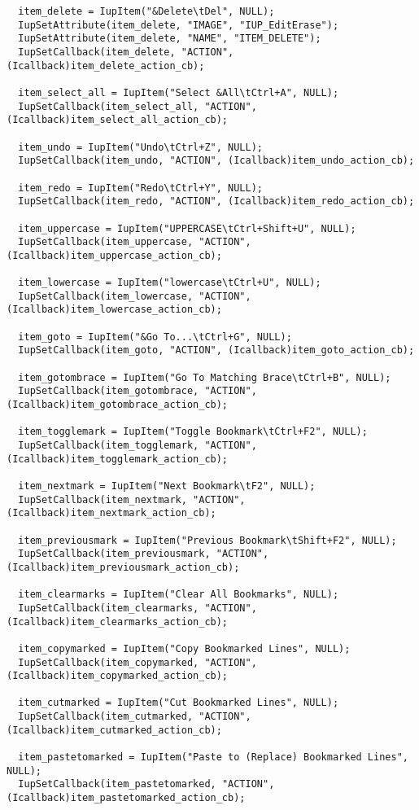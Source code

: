 \documentclass{ctexart}
\begin{document}
\begin{lstlisting}
  item_delete = IupItem("&Delete\tDel", NULL);
  IupSetAttribute(item_delete, "IMAGE", "IUP_EditErase");
  IupSetAttribute(item_delete, "NAME", "ITEM_DELETE");
  IupSetCallback(item_delete, "ACTION", (Icallback)item_delete_action_cb);

  item_select_all = IupItem("Select &All\tCtrl+A", NULL);
  IupSetCallback(item_select_all, "ACTION", (Icallback)item_select_all_action_cb);

  item_undo = IupItem("Undo\tCtrl+Z", NULL);
  IupSetCallback(item_undo, "ACTION", (Icallback)item_undo_action_cb);

  item_redo = IupItem("Redo\tCtrl+Y", NULL);
  IupSetCallback(item_redo, "ACTION", (Icallback)item_redo_action_cb);

  item_uppercase = IupItem("UPPERCASE\tCtrl+Shift+U", NULL);
  IupSetCallback(item_uppercase, "ACTION", (Icallback)item_uppercase_action_cb);

  item_lowercase = IupItem("lowercase\tCtrl+U", NULL);
  IupSetCallback(item_lowercase, "ACTION", (Icallback)item_lowercase_action_cb);

  item_goto = IupItem("&Go To...\tCtrl+G", NULL);
  IupSetCallback(item_goto, "ACTION", (Icallback)item_goto_action_cb);

  item_gotombrace = IupItem("Go To Matching Brace\tCtrl+B", NULL);
  IupSetCallback(item_gotombrace, "ACTION", (Icallback)item_gotombrace_action_cb);

  item_togglemark = IupItem("Toggle Bookmark\tCtrl+F2", NULL);
  IupSetCallback(item_togglemark, "ACTION", (Icallback)item_togglemark_action_cb);

  item_nextmark = IupItem("Next Bookmark\tF2", NULL);
  IupSetCallback(item_nextmark, "ACTION", (Icallback)item_nextmark_action_cb);

  item_previousmark = IupItem("Previous Bookmark\tShift+F2", NULL);
  IupSetCallback(item_previousmark, "ACTION", (Icallback)item_previousmark_action_cb);

  item_clearmarks = IupItem("Clear All Bookmarks", NULL);
  IupSetCallback(item_clearmarks, "ACTION", (Icallback)item_clearmarks_action_cb);

  item_copymarked = IupItem("Copy Bookmarked Lines", NULL);
  IupSetCallback(item_copymarked, "ACTION", (Icallback)item_copymarked_action_cb);

  item_cutmarked = IupItem("Cut Bookmarked Lines", NULL);
  IupSetCallback(item_cutmarked, "ACTION", (Icallback)item_cutmarked_action_cb);

  item_pastetomarked = IupItem("Paste to (Replace) Bookmarked Lines", NULL);
  IupSetCallback(item_pastetomarked, "ACTION", (Icallback)item_pastetomarked_action_cb);


\end{lstlisting}
\end{document}
